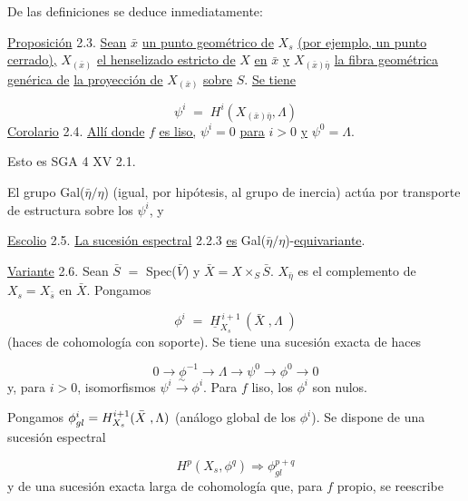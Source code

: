 
De las definiciones se deduce inmediatamente:

\underline{Proposición} 2.3.  \underline{Sean} $\bar{x}$ \underline{un punto geométrico de} $X_s$ \underline{(por ejemplo, un punto cerrado),} $X_{(\bar{x})}$ \underline{el henselizado estricto de} $X$ \underline{en} $\bar{x}$ \underline{y} $X_{(\bar{x})\bar{\eta}}$ \underline{la fibra geométrica genérica de} \underline{la proyección de} $X_{(\bar{x})}$ \underline{sobre} $S$. \underline{Se tiene}

\begin{equation*}
\psi^i \;=\; H^i(X_{(\bar{x})\bar{\eta}},\Lambda)
\end{equation*}
\underline{Corolario} 2.4.  \underline{Allí donde} $f$ \underline{es liso,} $\psi^i = 0$ \underline{para} $i > 0$ \underline{y} $\psi^{0} = \Lambda$.

Esto es SGA 4 XV 2.1.

El grupo Gal($\bar{\eta}/\eta$) (igual, por hipótesis, al grupo de inercia) actúa por transporte de estructura sobre los $\psi^i$, y

\underline{Escolio} 2.5.  \underline{La sucesión espectral} 2.2.3 \underline{es} Gal($\bar{\eta}/\eta$)-\underline{equivariante}.

\underline{Variante} 2.6.  Sean $\bar{S}$ $=$ Spec($\bar{V}$) y $\bar{X} = X \times_S \bar{S}$. $X_{\bar{\eta}}$ es el complemento de $X_s = X_{\bar{s}}$ en $\bar{X}$. Pongamos

\begin{equation*}
\phi^i \;=\; \underline{H}^{\,i+1}_{X_s}\,(\bar{X}\;,\Lambda\;)
\end{equation*}
(haces de cohomología con soporte). Se tiene una sucesión exacta de haces

\begin{equation*}
0 \longrightarrow \phi^{-1} \longrightarrow \Lambda \longrightarrow \psi^{0} \longrightarrow \phi^{0} \longrightarrow 0
\end{equation*}
y, para $i > 0$, isomorfismos $\psi^i \xrightarrow{\ \sim\ } \phi^i$. Para $f$ liso, los $\phi^i$ son nulos.

Pongamos $\phi^i_{gl} = H^{\sisi{i}{i+1}}_{X_s}(\bar{X}\;,\Lambda)$ (análogo global de los $\phi^i$). Se dispone de una sucesión espectral

\begin{equation*}\tag{2.6.1}
H^p(X_s,\phi^q) \Longrightarrow \phi^{p+q}_{gl}
\end{equation*}
y de una sucesión exacta larga de cohomología que, para $f$ propio, se reescribe

